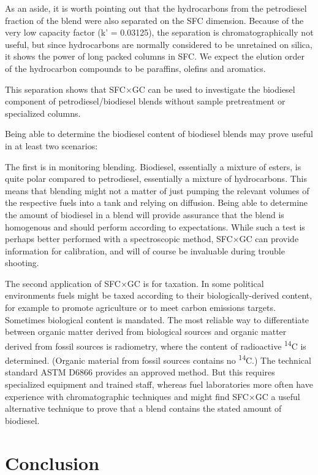 As an aside, it is worth pointing out that the hydrocarbons from the petrodiesel
fraction of the blend were also separated on the SFC dimension. Because of the
very low capacity factor (k' = \num{0.03125}), the separation is
chromatographically not useful, but since hydrocarbons are normally considered
to be unretained on silica, it shows the power of long packed columns in SFC. We
expect the elution order of the hydrocarbon compounds to be paraffins, olefins
and aromatics.

This separation shows that SFC×GC can be used to investigate the biodiesel
component of petrodiesel/biodiesel blends without sample pretreatment or
specialized columns.

Being able to determine the biodiesel content of biodiesel blends may prove
useful in at least two scenarios: 

The first is in monitoring blending. Biodiesel, essentially a mixture of esters,
is quite polar compared to petrodiesel, essentially a mixture of hydrocarbons.
This means that blending might not a matter of just pumping the relevant volumes
of the respective fuels into a tank and relying on diffusion. Being able to
determine the amount of biodiesel in a blend will provide assurance that the
blend is homogenous and should perform according to expectations. While such a
test is perhaps better performed with a spectroscopic method, SFC×GC can provide
information for calibration, and will of course be invaluable during trouble
shooting.

The second application of SFC×GC is for taxation. In some political environments
fuels might be taxed according to their biologically-derived content, for
example to promote agriculture or to meet carbon emissions targets. Sometimes
biological content is mandated. The most reliable way to differentiate between
organic matter derived from biological sources and organic matter derived from
fossil sources is radiometry, where the content of radioactive
\textsuperscript{14}C is determined. (Organic material from fossil sources
contains no \textsuperscript{14}C.) The technical standard ASTM D6866 provides
an approved method. But this requires specialized equipment and trained staff,
whereas fuel laboratories more often have experience with chromatographic
techniques and might find SFC×GC a useful alternative technique to prove that a
blend contains the stated amount of biodiesel.

\section{Conclusion}

